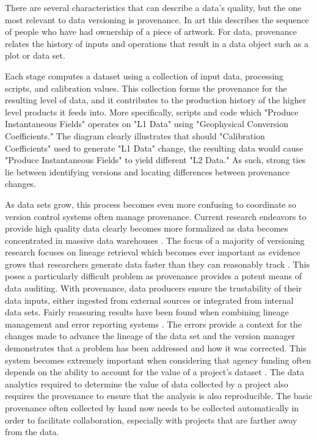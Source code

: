 There are several characteristics that can describe a data's quality, but the one most relevant to data versioning is provenance.
In art this describes the sequence of people who have had ownership of a piece of artwork.
For data, provenance relates the history of inputs and operations that result in a data object such as a plot or data set.

Each stage computes a dataset using a collection of input data, processing scripts, and calibration values.
This collection forms the provenance for the resulting level of data, and it contributes to the production history of the higher level products it feeds into.
More specifically, scripts and code which "Produce Instantaneous Fields" operates on "L1 Data" using "Geophysical Conversion Coefficients."
The diagram clearly illustrates that should "Calibration Coefficients" used to generate "L1 Data" change, the resulting data would cause "Produce Instantaneous Fields" to yield different "L2 Data."
As such, strong ties lie between identifying versions and locating differences between provenance changes.

As data sets grow, this process becomes even more confusing to coordinate so version control systems often manage provenance.
Current research endeavors to provide high quality data clearly becomes more formalized as data becomes concentrated in massive data warehouses \cite{Vassiliadis1999}.
The focus of a majority of versioning research focuses on lineage retrieval which becomes ever important as evidence grows that researchers generate data faster than they can reasonably track \cite{Bose:2005:LRS:1057977.1057978}.
This poses a particularly difficult problem as provenance provides a potent means of data auditing.
With provenance, data producers ensure the trustability of their data inputs, either ingested from external sources or integrated from internal data sets.
Fairly reassuring results have been found when combining lineage management and error reporting systems \cite{Fischer2003}.
The errors provide a context for the changes made to advance the lineage of the data set and the version manager demonstrates that a problem has been addressed and how it was corrected.
This system becomes extremely important when considering that agency funding often depends on the ability to account for the value of a project's dataset \cite{Cavanaugh2002}.
The data analytics required to determine the value of data collected by a project also requires the provenance to ensure that the analysis is also reproducible.
The basic provenance often collected by hand now needs to be collected automatically in order to facilitate collaboration, especially with projects that are farther away from the data.

